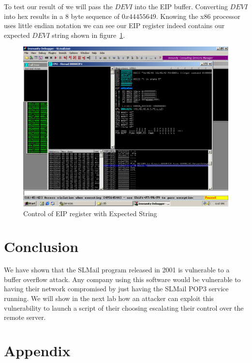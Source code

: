 \documentclass[12pt]{article}
\begin{document}
To test our result of we will pass the $DEVI$ into the EIP buffer. Converting
$DEVI$ into hex results in a 8 byte sequence of $0x44455649$. Knowing the
x86 processor uses little endian notation we can see our EIP register
indeed contains our expected $DEVI$ string shown in 
figure~\ref{fig:controleip}.

\begin{figure}[htbp]
    \centering
    \includegraphics[width=5.5in]{images/20160501_controlEIP.png}
    \caption{Control of EIP register with Expected String}
    \label{fig:controleip}
\end{figure}

\section{Conclusion}
\label{sect:conclusion}
We have shown that the SLMail program released in 2001 is vulnerable to 
a buffer overflow attack. Any company using this software would be vulnerable
to having their network compromised by just having the SLMail POP3 service
running. We will show in the next lab how an attacker can exploit this
vulnerability to launch a script of their choosing escalating their control
over the remote server. 

\nocite{*}



\section*{Appendix}
\label{sect:appendix}

\end{document}
